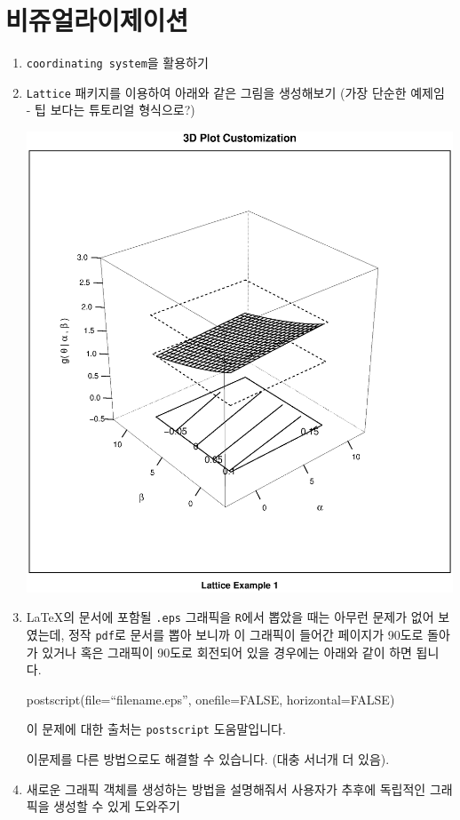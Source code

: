 \documentclass{article}
\begin{document}
%
%

\section{비쥬얼라이제이션}
\begin{enumerate}
\item \texttt{coordinating system}을 활용하기

\item \texttt{Lattice} 패키지를 이용하여 아래와 같은 그림을 생성해보기 (가장 단순한 예제임 - 팁 보다는 튜토리얼 형식으로?)

\includegraphics{./img/lattice-fig.eps}


\item \LaTeX 의 문서에 포함될 \texttt{.eps} 그래픽을 \texttt{R}에서 뽑았을 때는 아무런 문제가 없어 보였는데, 정작 \texttt{pdf}로 문서를 뽑아 보니까 이 그래픽이 들어간 페이지가 90도로 돌아가 있거나 혹은 그래픽이 90도로 회전되어 있을 경우에는 아래와 같이 하면 됩니다.

\begin{Schunk}
 \begin{Sinput}
  postscript(file=``filename.eps'', onefile=FALSE, horizontal=FALSE)
 \end{Sinput}
\end{Schunk}

이 문제에 대한 출처는 \texttt{postscript} 도움말입니다.

이문제를 다른 방법으로도 해결할 수 있습니다.  (대충 서너개 더 있음).

\item 새로운 그래픽 객체를 생성하는 방법을 설명해줘서 사용자가 추후에 독립적인 그래픽을 생성할 수 있게 도와주기 
\end{enumerate}
\end{document}
